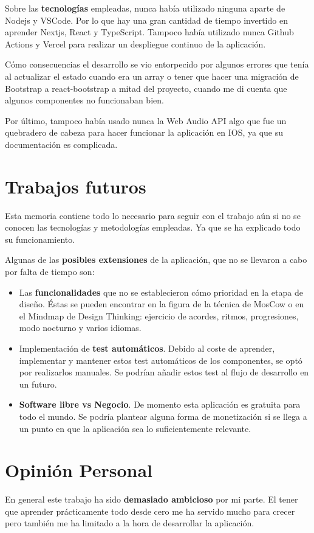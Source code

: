 \documentclass[12pt,twoside,titlepage]{report}
\begin{document}
{Sobre las \textbf{tecnologías} empleadas, nunca había utilizado ninguna aparte de Nodejs y VSCode. Por lo que hay una gran cantidad de tiempo invertido en aprender Nextjs, React y TypeScript. Tampoco había utilizado nunca Github Actions y Vercel para realizar un despliegue continuo de la aplicación. 

Cómo consecuencias el desarrollo se vio entorpecido por algunos errores que tenía al actualizar el estado cuando era un array o tener que hacer una migración de Bootstrap a react-bootstrap a mitad del proyecto, cuando me di cuenta que algunos componentes no funcionaban bien. 

Por último, tampoco había usado nunca la Web Audio API algo que fue un quebradero de cabeza para hacer funcionar la aplicación en IOS, ya que su documentación es complicada.

\section{Trabajos futuros}

Esta memoria contiene todo lo necesario para seguir con el trabajo aún si no se conocen las tecnologías y metodologías empleadas. Ya que se ha explicado todo su funcionamiento.

Algunas de las \textbf{posibles extensiones} de la aplicación, que no se llevaron a cabo por falta de tiempo son:

\begin{itemize}
    \item Las \textbf{funcionalidades} que no se establecieron cómo prioridad en la etapa de diseño. Éstas se pueden encontrar en la figura de la técnica de MosCow o en el Mindmap de Design Thinking: ejercicio de acordes, ritmos, progresiones, modo nocturno y varios idiomas.
    \item Implementación de \textbf{test automáticos}. Debido al coste de aprender, implementar y mantener estos test automáticos de los componentes, se optó por realizarlos manuales. Se podrían añadir estos test al flujo de desarrollo en un futuro.
    \item \textbf{Software libre vs Negocio}. De momento esta aplicación es gratuita para todo el mundo. Se podría plantear alguna forma de monetización si se llega a un punto en que la aplicación sea lo suficientemente relevante.
\end{itemize}

\section{Opinión Personal}
En general este trabajo ha sido \textbf{demasiado ambicioso} por mi parte. El tener que aprender prácticamente todo desde cero me ha servido mucho para crecer pero también me ha limitado a la hora de desarrollar la aplicación.

}
\end{document}
